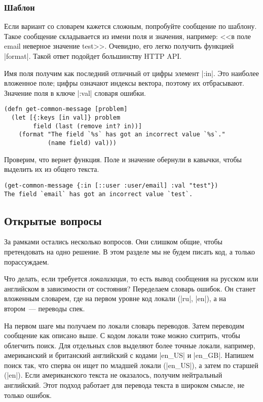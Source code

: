 \subsubsection{Шаблон}

Если вариант со словарем кажется сложным, попробуйте сообщение по шаблону. Такое
сообщение складывается из имени поля и значения, например: <<в поле email
неверное значение test>>.  Очевидно, его легко получить функцией
\spverb|format|. Такой ответ подойдет большинству HTTP API.

Имя поля получим как последний отличный от цифры элемент \spverb|:in|. Это
наиболее вложенное поле; цифры означают индексы вектора, поэтому их
отбрасывают. Значение поля в ключе \spverb|:val| словаря ошибки.

\begin{verbatim}
(defn get-common-message [problem]
  (let [{:keys [in val]} problem
        field (last (remove int? in))]
    (format "The field `%s` has got an incorrect value `%s`."
            (name field) val)))
\end{verbatim}

Проверим, что вернет функция. Поле и значение обернули в кавычки, чтобы выделить
их из общего текста.

\begin{verbatim}
(get-common-message {:in [::user :user/email] :val "test"})
The field `email` has got an incorrect value `test`.
\end{verbatim}

\subsection{Открытые вопросы}

За рамками остались несколько вопросов. Они слишком общие, чтобы претендовать на
одно решение. В этом разделе мы не будем писать код, а только порассуждаем.

Что делать, если требуется \emph{локализация}, то есть вывод сообщения на русском или
английском в зависимости от состояния? Переделаем словарь ошибок. Он станет
вложенным словарем, где на первом уровне код локали (\spverb|ru|, \spverb|en|),
а на втором~--- переводы спек.

На первом шаге мы получаем по локали словарь переводов. Затем переводим
сообщение как описано выше. С кодом локали тоже можно схитрить, чтобы облегчить
поиск. Для отдельных слов выделяют более точные локали, например, американский и
британский английский с кодами \spverb|en_US| и \spverb|en_GB|. Напишем поиск
так, что сперва он ищет по младшей локали (\spverb|en_US|), а затем по старшей
(\spverb|en|). Если американского текста не оказалось, получим нейтральный
английский. Этот подход работает для перевода текста в широком смысле, не только
ошибок.

